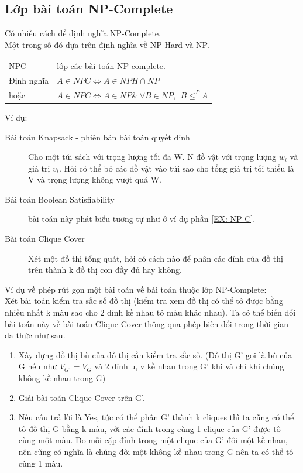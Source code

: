 \documentclass[a4paper 14pt]{extarticle}
\begin{document}
		\subsection{Lớp bài toán NP-Complete}
			Có nhiều cách để định nghĩa NP-Complete.\\
			Một trong số đó dựa trên định nghĩa về NP-Hard và NP.\\
			\begin{addmargin}{0.5in}
				\begin{tabular}{l l}
				NPC & lớp các bài toán NP-complete.\\
				Định nghĩa & $A \in NPC \Leftrightarrow A \in NPH \cap NP$\\
				hoặc & $A \in NPC \Leftrightarrow A \in NP\&~\forall B \in NP,~~B \leq^{P}A$\\
				\end{tabular}
			\end{addmargin}
			Ví dụ:
			\begin{description}
				\item[Bài toán Knapsack - phiên bản bài toán quyết đinh]  Cho một túi sách với trọng lượng tối đa W. N đồ vật với trọng lượng $w_{i}$ và giá trị $v_{i}$. Hỏi có thể bỏ các đồ vật vào túi sao cho tổng giá trị tối thiểu là V và trọng lượng không vượt quá W.
				\item[Bài toán Boolean Satisfiability] bài toán này phát biểu tương tự như ở ví dụ phần \ref{EX: NP-C}.
				\item[Bài toán Clique Cover] Xét một đồ thị tổng quát, hỏi có cách nào để phân các đỉnh của đồ thị trên thành k đồ thị con đầy đủ hay không.
			\end{description}
			Ví dụ về phép rút gọn một bài toán về bài toán thuộc lớp NP-Complete:\\
			Xét bài toán kiểm tra sắc số đồ thị (kiểm tra xem đồ thị có thể tô được bằng nhiều nhất k màu sao cho 2 đỉnh kề nhau tô màu khác nhau). Ta có thể biến đổi bài toán này về bài toán Clique Cover thông qua phép biến đổi trong thời gian đa thức như sau.\\
			\begin{enumerate}
				\item Xây dựng đồ thị bù của đồ thị cần kiểm tra sắc số. (Đồ thị G' gọi là bù của G nếu như $V_{G'} = V_{G}$ và 2 đỉnh u, v kề nhau trong G' khi và chỉ khi chúng không kề nhau trong G)
				\item Giải bài toán Clique Cover trên G'.
				\item Nếu câu trả lời là Yes, tức có thể phân G' thành k cliques thì ta cũng có thể tô đồ thị G bằng k màu, với các đỉnh trong cùng 1 clique của G' được tô cùng một màu. Do mỗi cặp đỉnh trong một clique của G' đôi một kề nhau, nên cũng có nghĩa là chúng đôi một không kề nhau trong G nên ta có thể tô cùng 1 màu.
			\end{enumerate}
\end{document}
